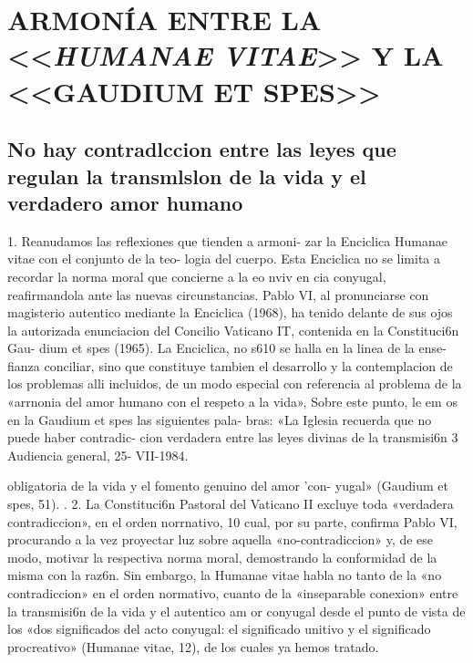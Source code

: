 \documentclass[letterpaper]{report}
\begin{document}
	{\centering
		\section{ARMON\'IA ENTRE LA <<\textit{HUMANAE VITAE}>> Y LA <<GAUDIUM ET SPES>>}
	}
		\subsection{No hay contradlccion entre las leyes que regulan 
		la transmlslon de la vida y el verdadero amor humano }
			1. Reanudamos las reflexiones que tienden a armoni- 
			zar la Enciclica Humanae vitae con el conjunto de la teo- 
			logia del cuerpo. 
			Esta Enciclica no se limita a recordar la norma moral 
			que concierne a la eo nviv en cia conyugal, reafirmandola 
			ante las nuevas circunstancias. Pablo VI, al pronunciarse 
			con magisterio autentico mediante la Enciclica (1968), ha 
			tenido delante de sus ojos la autorizada enunciacion del 
			Concilio Vaticano IT, contenida en la Constituci6n Gau- 
			dium et spes (1965). 
			La Enciclica, no s610 se halla en la linea de la ense- 
			fianza conciliar, sino que constituye tambien el desarrollo 
			y la contemplacion de los problemas alli incluidos, de un 
			modo especial con referencia al problema de la «arrnonia 
			del amor humano con el respeto a la vida», Sobre este 
			punto, le em os en la Gaudium et spes las siguientes pala- 
			bras: «La Iglesia recuerda que no puede haber contradic- 
			cion verdadera entre las leyes divinas de la transmisi6n 
			3 Audiencia general, 25- VII-1984. 

			obligatoria de la vida y el fomento genuino del amor 'con- 
				yugal» (Gaudium et spes, 51). 	. 
			2. La Constituci6n Pastoral del Vaticano II excluye 
			toda «verdadera contradiccion», en el orden norrnativo, 10 
			cual, por su parte, confirma Pablo VI, procurando a la vez 
			proyectar luz sobre aquella «no-contradiccion» y, de ese 
			modo, motivar la respectiva norma moral, demostrando 
			la conformidad de la misma con la raz6n. 
			Sin embargo, la Humanae vitae habla no tanto de la 
			«no contradiccion» en el orden normativo, cuanto de la 
			«inseparable conexion» entre la transmisi6n de la vida y 
			el autentico am or conyugal desde el punto de vista de los 
			«dos significados del acto conyugal: el significado unitivo 
			y el significado procreativo» (Humanae vitae, 12), de los 
			cuales ya hemos tratado.
			
\end{document}
